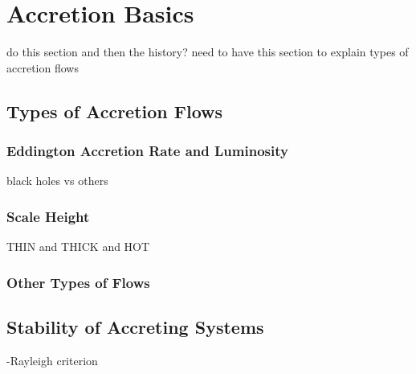 \section{Accretion Basics}
do this section and then the history? 
need to have this section to explain types of accretion flows 

\subsection{Types of Accretion Flows}
\subsubsection{Eddington Accretion Rate and Luminosity}
black holes vs others
\subsubsection{Scale Height}
THIN and THICK and HOT
\subsubsection{Other Types of Flows}

\subsection{Stability of Accreting Systems}
-Rayleigh criterion

